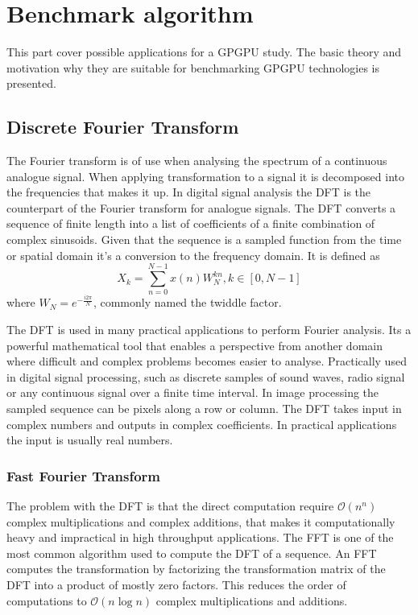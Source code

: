 \chapter{Benchmark algorithm}\label{cha:algorithms}
This part cover possible applications for a \gls{GPGPU} study. The basic theory and motivation why they are suitable for benchmarking \gls{GPGPU} technologies is presented.%

\section{Discrete Fourier Transform}
The Fourier transform is of use when analysing the spectrum of a continuous analogue signal. When applying transformation to a signal it is decomposed into the frequencies that makes it up. In digital signal analysis the \gls{DFT} is the counterpart of the Fourier transform for analogue signals. The \gls{DFT} converts a sequence of finite length into a list of coefficients of a finite combination of complex sinusoids. Given that the sequence is a sampled function from the time or spatial domain it's a conversion to the frequency domain. It is defined as
\begin{equation}
	X_k=\sum_{n=0}^{N-1}x(n)W_N^{kn}, k \in {[0, N-1]}	
\end{equation}
where $W_N=e^{-\frac{i2{\pi}}{N}}$, commonly named the twiddle factor\cite{gentleman1966fast}.

The \gls{DFT} is used in many practical applications to perform Fourier analysis. Its a powerful mathematical tool that enables a perspective from another domain where difficult and complex problems becomes easier to analyse. Practically used in digital signal processing, such as discrete samples of sound waves, radio signal or any continuous signal over a finite time interval. In image processing the sampled sequence can be pixels along a row or column. The \gls{DFT} takes input in complex numbers and outputs in complex coefficients. In practical applications the input is usually real numbers.

\subsection{Fast Fourier Transform}\label{sec:algorithms:fft}
The problem with the \gls{DFT} is that the direct computation require $\mathcal{O}(n^n)$ complex multiplications and complex additions, that makes it computationally heavy and impractical in high throughput applications. The \gls{FFT} is one of the most common algorithm used to compute the \gls{DFT} of a sequence. An \gls{FFT} computes the transformation by factorizing the transformation matrix of the \gls{DFT} into a product of mostly zero factors. This reduces the order of computations to $\mathcal{O}(n\log{}n)$ complex multiplications and additions.

